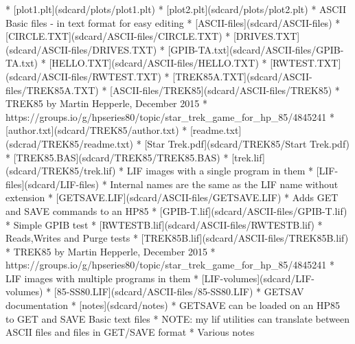 \begin{DoxyItemize}
\begin{DoxyItemize}
\begin{DoxyItemize}
\begin{DoxyItemize}
\begin{DoxyItemize}
\begin{DoxyItemize}
\begin{DoxyItemize}
\begin{DoxyVerb}
      * [plot1.plt](sdcard/plots/plot1.plt)
      * [plot2.plt](sdcard/plots/plot2.plt)
  * ASCII Basic files - in text format for easy editing
    * [ASCII-files](sdcard/ASCII-files)
      * [CIRCLE.TXT](sdcard/ASCII-files/CIRCLE.TXT)
      * [DRIVES.TXT](sdcard/ASCII-files/DRIVES.TXT)
      * [GPIB-TA.txt](sdcard/ASCII-files/GPIB-TA.txt)
      * [HELLO.TXT](sdcard/ASCII-files/HELLO.TXT)
      * [RWTEST.TXT](sdcard/ASCII-files/RWTEST.TXT)
      * [TREK85A.TXT](sdcard/ASCII-files/TREK85A.TXT)
      * [ASCII-files/TREK85](sdcard/ASCII-files/TREK85)
        * TREK85 by Martin Hepperle, December 2015
          * https://groups.io/g/hpseries80/topic/star_trek_game_for_hp_85/4845241
        * [author.txt](sdcard/TREK85/author.txt)  
        * [readme.txt](sdcrad/TREK85/readme.txt)    
        * [Star Trek.pdf](sdcard/TREK85/Start Trek.pdf)
        * [TREK85.BAS](sdcard/TREK85/TREK85.BAS)
        * [trek.lif](sdcard/TREK85/trek.lif)
  * LIF images with a single program in them
    * [LIF-files](sdcard/LIF-files)
      * Internal names are the same as the LIF name without extension
    * [GETSAVE.LIF](sdcard/ASCII-files/GETSAVE.LIF)
      * Adds GET and SAVE commands to an HP85
    * [GPIB-T.lif](sdcard/ASCII-files/GPIB-T.lif)
      * Simple GPIB test
    * [RWTESTB.lif](sdcard/ASCII-files/RWTESTB.lif)
      * Reads,Writes and Purge tests
    * [TREK85B.lif](sdcard/ASCII-files/TREK85B.lif)
      * TREK85 by Martin Hepperle, December 2015
        * https://groups.io/g/hpseries80/topic/star_trek_game_for_hp_85/4845241
  * LIF images with multiple programs in them
    * [LIF-volumes](sdcard/LIF-volumes)
      * [85-SS80.LIF](sdcard/ASCII-files/85-SS80.LIF)
  * GETSAV documentation
    * [notes](sdcard/notes)
      * GETSAVE can be loaded on an HP85 to GET and SAVE Basic text files
        * NOTE: my lif utilities can translate between ASCII files and files in GET/SAVE format 
    * Various notes 
\end{DoxyVerb}
 

 
\end{DoxyItemize}
\end{DoxyItemize}
\end{DoxyItemize}
\end{DoxyItemize}
\end{DoxyItemize}
\end{DoxyItemize}
\end{DoxyItemize}